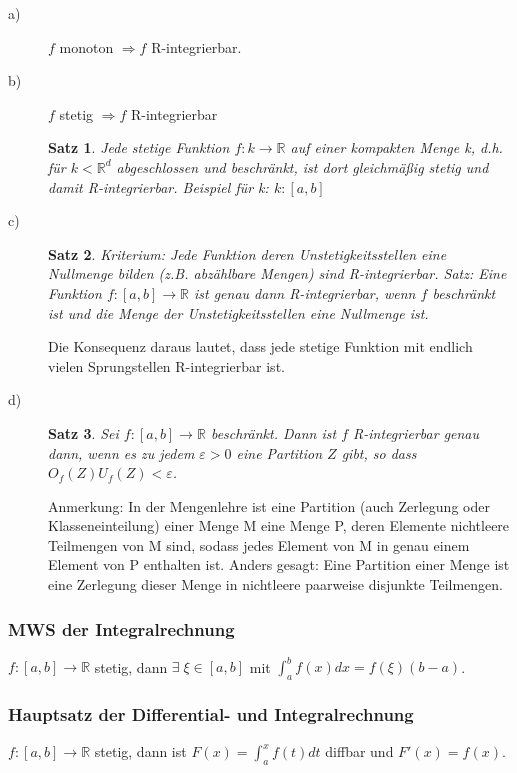 \documentclass[12pt,a4paper]{article}%
\let\harvardleftorig\harvardleft
\newtheorem{satz}{Satz}[section]
\numberwithin{equation}{section}
\newcommand{\R}{\mathbb{R}} %
\newcommand\citeVgl
{\def\harvardleft{(Vgl.\ \global\let\harvardleft\harvardleftorig}%
 \cite
}
\numberwithin{equation}{subsection}
\begin{document}
\begin{description}
\item[a)]
$f$ monoton $\Rightarrow f$ R-integrierbar.
\item[b)]
$f$ stetig $\Rightarrow f$ R-integrierbar
\begin{satz}
\glqq Jede stetige Funktion $f:k \rightarrow \R$ auf einer kompakten Menge k, d.h. für $k<\R^d$ abgeschlossen und beschränkt, ist dort gleichmäßig stetig und damit R-integrierbar.\grqq \cite{HM12}
Beispiel für k: $k:[a,b]$
\end{satz}
\item[c)]
\begin{satz}
Kriterium: Jede Funktion deren Unstetigkeitsstellen eine Nullmenge bilden (z.B. abzählbare Mengen) sind R-integrierbar.
\glqq Satz: Eine Funktion $f:[a,b]\rightarrow \R$ ist genau dann R-integrierbar, wenn $f$ beschränkt ist und die Menge der Unstetigkeitsstellen eine Nullmenge ist. 
\grqq \cite{HM12}
\end{satz}
Die Konsequenz daraus lautet, dass jede stetige Funktion mit endlich vielen Sprungstellen R-integrierbar ist. \citeVgl{HM12}
\item[d)]
\begin{satz}
\glqq Sei $f:[a,b] \rightarrow \R$ beschränkt. Dann ist $f$ R-integrierbar genau dann, wenn es zu jedem $\varepsilon > 0$ eine Partition $Z$ gibt, 
so dass
$O_f(Z)  U_f(Z) < \varepsilon$. \grqq \cite{HM12}
\end{satz}
Anmerkung: \glqq In der Mengenlehre ist eine Partition (auch Zerlegung oder Klasseneinteilung) einer Menge M eine Menge P, deren Elemente nichtleere Teilmengen von M sind, sodass jedes Element von M in genau einem Element von P enthalten ist. Anders gesagt: Eine Partition einer Menge ist eine Zerlegung dieser Menge in nichtleere paarweise disjunkte Teilmengen.\grqq  \cite{wiki}

\end{description}

\subsubsection{MWS der Integralrechnung}
$f:[a,b]\rightarrow\R$ stetig, dann $\exists \; \xi \in[a,b]$ mit $\int_a^b f(x)dx = f(\xi)(b-a)$.

\subsubsection{Hauptsatz der Differential- und Integralrechnung}
$f:[a,b]\rightarrow\R$ stetig, dann ist $F(x) = \int_a^x f(t)dt$ diffbar und $F'(x) = f(x)$.
\end{document}
